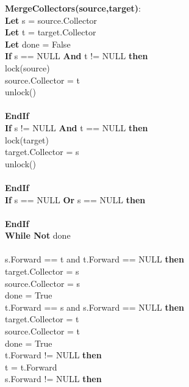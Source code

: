 \begin{algorithm}[ht]
{\small
{\bf MergeCollectors(source,target)}:\\
{\Indp
{\bf Let} s = source.Collector\\
{\bf Let} t = target.Collector\\
{\bf Let} done = False\\
{\bf If} s == NULL {\bf And} t != NULL {\bf then}\\
\quad lock(source)\\
\quad source.Collector = t\\
\quad unlock()\\
\\
{\bf EndIf}\\
{\bf If} s != NULL {\bf And} t == NULL {\bf then}\\
\quad lock(target)\\
\quad target.Collector = s\\
\quad unlock()\\
\\
{\bf EndIf}\\
{\bf If} s == NULL {\bf Or} s == NULL {\bf then}\\
\\
{\bf EndIf}\\
{\bf While Not} done\\
\\
 s.Forward == t and t.Forward == NULL {\bf then}\\
\quad \quad target.Collector = s\\
\quad \quad source.Collector = s\\
\quad \quad done = True\\
 t.Forward == s and s.Forward == NULL {\bf then}\\
\quad \quad target.Collector = t\\
\quad \quad source.Collector = t\\
\quad \quad done = True\\
 t.Forward != NULL {\bf then}\\
\quad \quad t = t.Forward \\
 s.Forward != NULL {\bf then}\\
}}
\end{algorithm}
